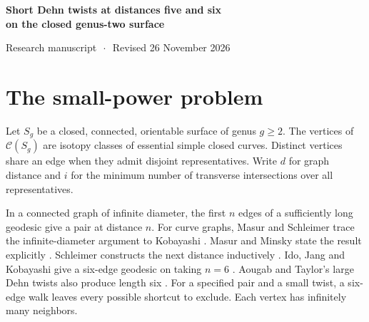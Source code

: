 \documentclass[11pt,a4paper]{article}
\newcommand{\C}{\mathcal C}
\begin{document}
\begin{center}
{\LARGE\bfseries Short Dehn twists at distances five and six\\[3pt]
on the closed genus-two surface\par}
\vspace{9pt}
{\small Research manuscript \(\,\cdot\,\) Revised 26 November 2026}
\end{center}

\begin{abstract}
For the twelve-intersection distance-four pair \((a,b)\) in Figure 18 of
Mahanta's distance-five preprint, we determine \(d(a,T_b^k a)\) for every
integer \(k\). Its value is five for \(|k|=1\) and six for \(|k|\ge2\).
We give two more genus-two diagrams. A fourteen-intersection seed produces
a distance-six pair with 196 intersections after a single twist. A
complete enumeration shows that every distance-four seed with twelve or
thirteen intersections gives distance five after a single twist. Thus
fourteen is the least possible seed intersection for this construction.
Minimality is sufficient in genus two, as conjectured in version 2 of
Mahanta's preprint, and the thirteen-intersection examples disprove the
necessity conjectured in version 3. The proof combines efficient
geodesics, annular projection, and reproducible finite computations.
\end{abstract}

\section{The small-power problem}
Let \(S_g\) be a closed, connected, orientable surface of genus \(g\ge2\).
The vertices of \(\C(S_g)\) are isotopy classes of essential simple closed
curves. Distinct vertices share an edge when they admit disjoint
representatives. Write \(d\) for graph distance and \(i\) for the minimum
number of transverse intersections over all representatives.

In a connected graph of infinite diameter, the first \(n\) edges of a
sufficiently long geodesic give a pair at distance \(n\). For curve
graphs, Masur and Schleimer \cite[proof of Lemma~2.5]{MS} trace the
infinite-diameter argument to Kobayashi \cite[Prop.~2.2]{K}. Masur and
Minsky state the result explicitly \cite[Thm.~1.1]{MM1}. Schleimer
constructs the next distance inductively \cite[proof of Prop.~3.1]{S}.
Ido, Jang and Kobayashi give a six-edge geodesic on taking \(n=6\)
\cite[Construction~4.6 and Assertion~4.7]{IJK}. Aougab and Taylor's
large Dehn twists also produce length six \cite[\S5, Lemma~5.1]{AT}.
For a specified pair and a small twist, a six-edge walk leaves every
possible shortcut to exclude. Each vertex has infinitely many neighbors.
\end{document}
